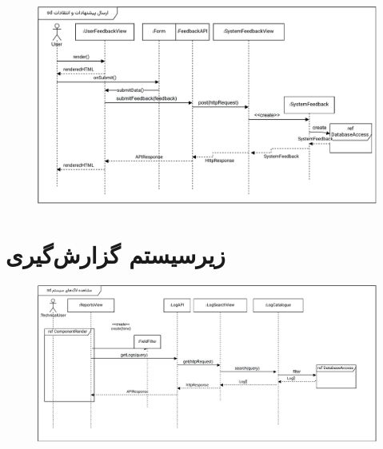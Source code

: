 \begin{figure}[ht!]
	\centering
	\includegraphics[scale=0.8]{figs/design-sequence/3-30.pdf}
\end{figure}

\FloatBarrier
\newpage

\section{زیرسیستم گزارش‌گیری}

\eject \pdfpagewidth=10in \pdfpageheight=9in

\begin{figure}[ht!]
	\centering
	\includegraphics[scale=0.8]{figs/design-sequence/3-31.pdf}
\end{figure}

\FloatBarrier
\newpage

\eject \pdfpagewidth=10in \pdfpageheight=9in

